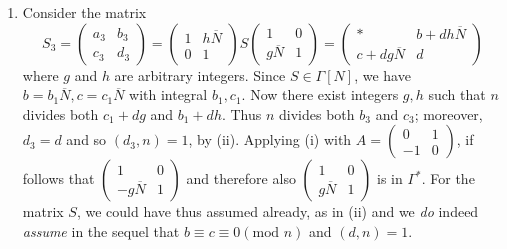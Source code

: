 \begin{enumerate}
\item Consider the matrix
$$
S_3 = \left(\begin{smallmatrix} a_3 &
  b_3\\c_3&d_3 \end{smallmatrix}\right)
= \left(\begin{smallmatrix} 1 & h\overline{N}\\ 0 &
  1 \end{smallmatrix}\right) S
\left(\begin{smallmatrix} 1&0\\g\overline{N}&
  1 \end{smallmatrix}\right) =
\left(\begin{smallmatrix}  \ast & b+dh\overline{N}\\ c+ d
  g\overline{N} & d \end{smallmatrix}\right)  
$$
where $g$ and $h$ are arbitrary integers. Since $S \in \Gamma[N]$,
we have $b=b_1 \overline{N}, c=c_1\overline{N}$ with integral $b_1,
c_1$. Now there exist integers $g,h$ such that $n$ divides both
$c_1+dg$ and $b_1+dh$. Thus $n$ divides both $b_3$ and $c_3$;
moreover, $d_3=d$ and so $(d_3,n)=1$, by (ii). Applying (i) with $A =
\left(\begin{smallmatrix} 0&1\\-1&0 \end{smallmatrix}\right)$, if
follows that $\left(\begin{smallmatrix} 1&0\\-g\overline{N}&
  1 \end{smallmatrix}\right)$ and therefore also
$\left(\begin{smallmatrix} 1&0\\g\overline{N}
  &1 \end{smallmatrix}\right)$ is in $\Gamma^{\ast}$. For the matrix
$S$, we could have thus assumed already, as in (ii) and we \textit{do}
indeed \textit{assume} in the sequel that $b\equiv c \equiv 0(\text{mod } n)$
and $(d,n)=1$. 
\end{enumerate}

